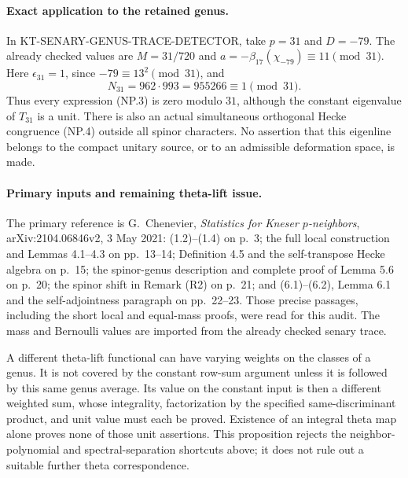 \paragraph{Exact application to the retained genus.}
In KT-SENARY-GENUS-TRACE-DETECTOR, take $p=31$ and $D=-79$.
The already checked values are $M=31/720$ and
$a=-\beta_{17}(\chi_{-79})\equiv11\pmod{31}$.
Here $\epsilon_{31}=1$, since $-79\equiv13^2\pmod{31}$, and
\[
                  N_{31}=962\cdot993=955266\equiv1\pmod{31}.
\]
Thus every expression (NP.3) is zero modulo $31$, although the
constant eigenvalue of $T_{31}$ is a unit.  There is also an actual
simultaneous orthogonal Hecke congruence (NP.4) outside all spinor
characters.  No assertion that this eigenline belongs to the compact
unitary source, or to an admissible deformation space, is made.

\paragraph{Primary inputs and remaining theta-lift issue.}
The primary reference is G.~Chenevier, \emph{Statistics for Kneser
$p$-neighbors}, arXiv:2104.06846v2, 3 May 2021: (1.2)--(1.4) on
p.~3; the full local construction and Lemmas 4.1--4.3 on pp.~13--14;
Definition 4.5 and the self-transpose Hecke algebra on p.~15;
the spinor-genus description and complete proof of Lemma 5.6 on
p.~20; the spinor shift in Remark (R2) on p.~21; and (6.1)--(6.2),
Lemma 6.1 and the self-adjointness paragraph on pp.~22--23.
Those precise passages, including the short local and equal-mass
proofs, were read for this audit.  The mass and Bernoulli values are
imported from the already checked senary trace.

A different theta-lift functional can have varying weights on the
classes of a genus.  It is not covered by the constant row-sum argument
unless it is followed by this same genus average.  Its value on the
constant input is then a different weighted sum, whose integrality,
factorization by the specified same-discriminant product, and unit
value must each be proved.  Existence of an integral theta map alone
proves none of those unit assertions.  This proposition rejects the
neighbor-polynomial and spectral-separation shortcuts above; it does
not rule out a suitable further theta correspondence.
